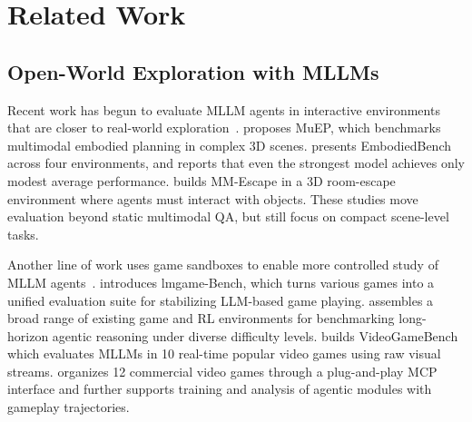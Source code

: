 \documentclass[11pt]{article}
\begin{document}
\begin{table}[t!]
\centering
{}
\caption{Ablation results of Claude-Opus-4.6 under different frame buffer sizes.}
\label{tab:frame_size}
\end{table}

\section{Related Work}

\subsection{Open-World Exploration with MLLMs}

Recent work has begun to evaluate MLLM agents in interactive environments that are closer to real-world exploration~\citep{MuEP, OpenNav, ChatVLA, CitySeeker}. 
\citet{MuEP} proposes MuEP, which benchmarks multimodal embodied planning in complex 3D scenes. 
\citet{EmbodiedBench} presents EmbodiedBench across four environments, and reports that even the strongest model achieves only modest average performance. 
\citet{MM-Escape} builds MM-Escape in a 3D room-escape environment where agents must interact with objects. 
These studies move evaluation beyond static multimodal QA, but still focus on compact scene-level tasks.

Another line of work uses game sandboxes to enable more controlled study of MLLM agents~\citep{AgentBench, Game_Survey, V-MAGE, GameWorld}. 
\citet{lmgame-Bench} introduces lmgame-Bench, which turns various games into a unified evaluation suite for stabilizing LLM-based game playing. 
\citet{BALROG} assembles a broad range of existing game and RL environments for benchmarking long-horizon agentic reasoning under diverse difficulty levels. 
\citet{VideoGameBench} builds VideoGameBench which evaluates MLLMs in 10 real-time popular video games using raw visual streams. 
\citet{Orak} organizes 12 commercial video games through a plug-and-play MCP interface and further supports training and analysis of agentic modules with gameplay trajectories. 
\end{document}
